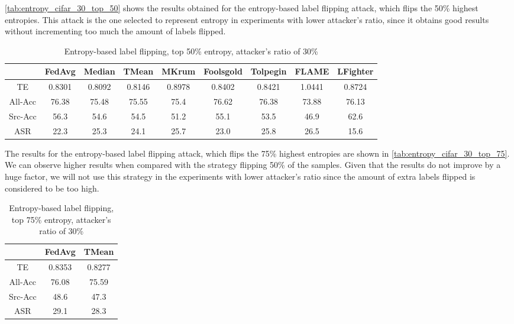 \autoref{tab:entropy_cifar_30_top_50} shows the results obtained for the entropy-based label flipping attack, which flips the 50\% highest entropies.
This attack is the one selected to represent entropy in experiments with lower attacker's ratio, since it obtains good results without incrementing too much the amount of labels flipped.

\begin{table}[h!]
        \centering
        \small
        \begin{adjustbox}{center}
        \begin{tabular}{|c|c|c|c|c|c|c|c|c|}
            \hline
            & FedAvg & Median & TMean & MKrum & Foolsgold & Tolpegin & FLAME & LFighter \\
            \hline
            TE & 0.8301 & 0.8092 & 0.8146 & 0.8978 & 0.8402 & 0.8421 & 1.0441 & 0.8724 \\
            \hline
            All-Acc & 76.38 & 75.48 & 75.55 & 75.4 & 76.62 & 76.38 & 73.88 & 76.13 \\
            \hline
            Src-Acc & 56.3 & 54.6 & 54.5 & 51.2 & 55.1 & 53.5 & 46.9 & 62.6 \\
            \hline
            ASR & 22.3 & 25.3 & 24.1 & 25.7 & 23.0 & 25.8 & 26.5 & 15.6 \\
            \hline
        \end{tabular}
        \end{adjustbox}
        \caption{Entropy-based label flipping, top 50\% entropy, attacker's ratio of 30\%}
        \label{tab:entropy_cifar_30_top_50}
    \end{table}
    

The results for the entropy-based label flipping attack, which flips the 75\% highest entropies are shown in \autoref{tab:entropy_cifar_30_top_75}. We can observe higher results when compared with the strategy flipping 50\% of the samples. Given that the results do not improve by a huge factor, we will not use this strategy in the experiments with lower attacker's ratio since the amount of extra labels flipped is considered to be too high.

\begin{table}[h!]
        \centering
        \small
        \begin{adjustbox}{center}
        \begin{tabular}{|c|c|c|}
            \hline
            & FedAvg & TMean \\
            \hline
            TE & 0.8353 & 0.8277 \\
            \hline
            All-Acc & 76.08 & 75.59 \\
            \hline
            Src-Acc & 48.6 & 47.3 \\
            \hline
            ASR & 29.1 & 28.3 \\
            \hline
        \end{tabular}
        \end{adjustbox}
        \caption{Entropy-based label flipping, top 75\% entropy, attacker's ratio of 30\%}
        \label{tab:entropy_cifar_30_top_75}
    \end{table}

